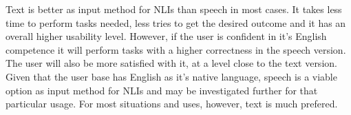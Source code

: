 Text is better as input method for NLIs than speech in most cases. It takes less time to perform tasks needed, less tries to get the desired outcome and it has an overall higher usability level. However, if the user is confident in it's English competence it will perform tasks with a higher correctness in the speech version. The user will also be more satisfied with it, at a level close to the text version. Given that the user base has English as it's native language, speech is a viable option as input method for NLIs and may be investigated further for that particular usage. For most situations and uses, however, text is much prefered.
